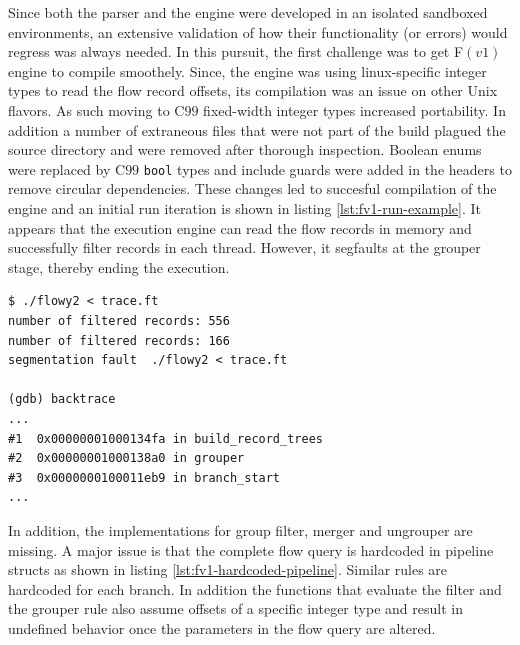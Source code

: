 Since both the parser and the engine were developed in an isolated sandboxed
environments, an extensive validation of how their functionality (or errors)
would regress was always needed. In this pursuit, the first challenge was to
get F$(v1)$ engine to compile smoothely.  Since, the engine was using
linux-specific integer types to read the flow record  offsets, its compilation was an issue on other Unix
flavors. As such moving to C$99$ \cite{c99:1999} fixed-width integer types
increased portability. In addition a number of extraneous files that were not
part of the build plagued the source directory and were removed after thorough
inspection. Boolean enums were replaced by C$99$ \texttt{bool} types and
include guards were added in the headers to remove circular dependencies.
These changes led to succesful compilation of the engine and an initial run
iteration is shown in listing \ref{lst:fv1-run-example}. It appears that the
execution engine can read the flow records in memory and successfully filter
records in each thread.  However, it segfaults at the grouper stage, thereby
ending the execution.

\begin{lstlisting}
$ ./flowy2 < trace.ft
number of filtered records: 556
number of filtered records: 166
segmentation fault  ./flowy2 < trace.ft

(gdb) backtrace
...
#1  0x00000001000134fa in build_record_trees
#2  0x00000001000138a0 in grouper
#3  0x0000000100011eb9 in branch_start
...
\end{lstlisting}

In addition, the implementations for group filter, merger and ungrouper are
missing. A major issue is that the complete flow query is hardcoded in
pipeline 
structs as shown in listing \ref{lst:fv1-hardcoded-pipeline}. Similar rules
are hardcoded for each branch. In addition the functions that evaluate the
filter and the grouper rule also assume offsets of a specific integer type and
result in undefined behavior once the parameters in the flow query are
altered.

